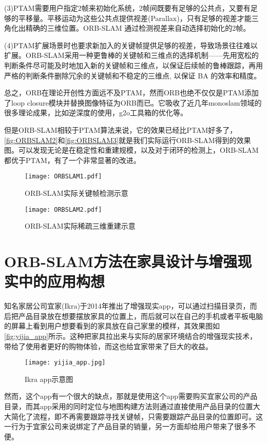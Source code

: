 (3)PTAM需要用户指定2帧来初始化系统，2帧间既要有足够的公共点，又要有足够的平移量。平移运动为这些公共点提供视差(Parallax)，只有足够的视差才能三角化出精确的三维位置。ORB-SLAM 通过检测视差来自动选择初始化的2帧。

(4)PTAM扩展场景时也要求新加入的关键帧提供足够的视差，导致场景往往难以扩展。ORB-SLAM采用一种更鲁棒的关键帧和三维点的选择机制——先用宽松的判断条件尽可能及时地加入新的关键帧和三维点，以保证后续帧的鲁棒跟踪，再用严格的判断条件删除冗余的关键帧和不稳定的三维点, 以保证 BA 的效率和精度。

总之，ORB在理论开创性方面远不及PTAM，然而ORB也绝不仅仅是PTAM添加了loop closure模块并替换图像特征为ORB而已。它吸收了近几年monoslam领域的很多理论成果，比如逆深度的使用，g2o工具箱的优化等。

但是ORB-SLAM相较于PTAM算法来说，它的效果已经比PTAM好多了，\autoref{fig:ORBSLAM2}和\autoref{fig:ORBSLAM3}就是我们实际运行ORB-SLAM得到的效果图。可以发现无论是在稳定性和重建规模，以及对于闭环的检测上，ORB-SLAM都优于PTAM，有了一个非常显著的改进。

\begin{figure}[!htbp]
\centering
\texttt{[image: ORBSLAM1.pdf]}
\caption{ORB-SLAM实际关键帧检测示意}
\label{fig:ORBSLAM2}
\end{figure}
\begin{figure}[!htbp]
\centering
\texttt{[image: ORBSLAM2.pdf]}
\caption{ORB-SLAM实际稀疏三维重建示意}
\label{fig:ORBSLAM3}
\end{figure}


\section{ORB-SLAM方法在家具设计与增强现实中的应用构想}
知名家居公司宜家(Ikra)于2014年推出了增强现实app，可以通过扫描目录页，而后把产品目录放在想要摆放家具的位置上，而后就可以在自己的手机或者平板电脑的屏幕上看到用户想要看到的家具放在自己家里的模样，其效果图如\autoref*{fig:yijia_app}所示。这种把家具拉出来与实际的居家环境结合的增强现实技术，带给了使用者更好的购物体验，而这也给宜家带来了巨大的收益。

\begin{figure}[!htbp]
\centering
\texttt{[image: yijia\_app.jpg]}
\caption{Ikra app示意图}
\label{fig:yijia_app}
\end{figure}

然而，这个app有一个很大的缺点，那就是使用这个app需要购买宜家公司的产品目录，而其app采用的同时定位与地图构建方法则通过直接使用产品目录的位置大大简化了流程，即不再需要跟踪寻找关键帧，只需要跟踪产品目录的位置即可。这一行为于宜家公司来说绑定了产品目录的销量，另一方面却给用户带来了很多不便。

